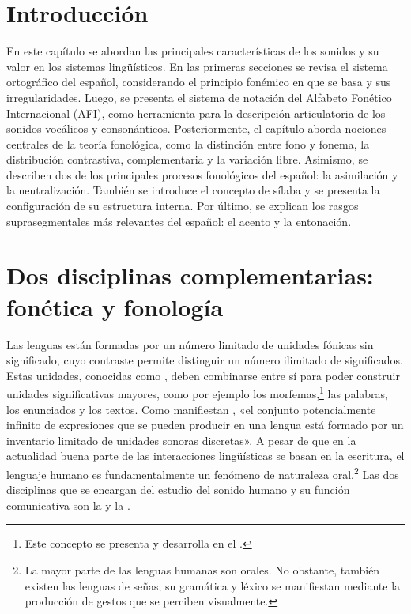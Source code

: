 
\section{Introducción}

En este capítulo se abordan las principales características de los sonidos y
su valor en los sistemas lingüísticos. En las primeras secciones se revisa el
sistema ortográfico del español, considerando el principio fonémico en que se
basa y sus irregularidades. Luego, se presenta el sistema de notación del
Alfabeto Fonético Internacional (AFI), como herramienta para la descripción
articulatoria de los sonidos vocálicos y consonánticos. Posteriormente, el
capítulo aborda nociones centrales de la teoría fonológica, como la distinción
entre fono y fonema, la distribución contrastiva, complementaria y la variación
libre. Asimismo, se describen dos de los principales procesos fonológicos del
español: la asimilación y la neutralización. También se introduce el concepto
de sílaba y se presenta la configuración de su estructura interna. Por último,
se explican los rasgos suprasegmentales más relevantes del español: el acento y
la entonación.

\section{Dos disciplinas complementarias: fonética y fonología}

Las lenguas están formadas por un número limitado de unidades fónicas sin
significado, cuyo contraste permite distinguir un número ilimitado de
significados. Estas unidades, conocidas como , deben
combinarse entre sí para poder construir unidades significativas mayores, como
por ejemplo los morfemas,\footnote{Este concepto se presenta y desarrolla en el
.} las palabras, los enunciados y los textos. Como manifiestan
\textcite[12]{casado2011}, «el conjunto potencialmente infinito de expresiones
que se pueden producir en una lengua está formado por un inventario limitado de
unidades sonoras discretas». A pesar de que en la actualidad buena parte de las
interacciones lingüísticas se basan en la escritura, el lenguaje humano es
fundamentalmente un fenómeno de naturaleza oral.\footnote{La mayor parte de las
lenguas humanas son orales. No obstante, también existen las lenguas de señas;
su gramática y léxico se manifiestan mediante la producción de gestos que se
perciben visualmente.} Las dos disciplinas que se encargan del estudio del
sonido humano y su función comunicativa son la  y la
.

